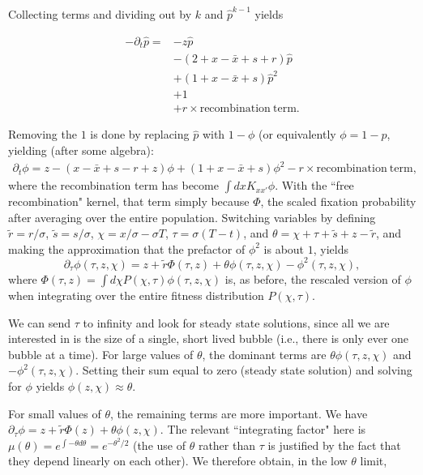 \documentclass[10pt]{revtex4}
\begin{document}
Collecting terms and dividing out by $k$ and $\hat{p}^{k-1}$ yields

\begin{align*}
-\partial_t\hat{p} = &-z\hat{p}\\
&-(2+x-\bar{x}+s+r)\hat{p} \\
&+ (1+x-\bar{x}+s)\hat{p}^2 \\
& + 1\\
&+r \times \mathrm{recombination~term}.
\end{align*}

Removing the $1$ is done by replacing $\hat{p}$ with $1-\phi$ (or equivalently $\phi = 1- \hat{p}$, yielding (after some algebra):
\begin{align*}\partial_t \phi = z - (x-\bar{x} + s - r+z)\phi + (1+x-\bar{x} + s)\phi^2 - r \times \mathrm{recombination~term},
\end{align*}
where the recombination term has become $\int dx K_{xx\prime} \phi$.
With the ``free recombination" kernel, that term simply because $\Phi$, the scaled fixation probability after averaging over the entire population.
Switching variables by defining $\tilde{r} = r/\sigma$, $\tilde{s} = s/\sigma$, $\chi = x/\sigma - \sigma T$, $\tau = \sigma(T-t)$, and $\theta = \chi+\tau+\tilde{s}+z-\tilde{r}$, and making the approximation that the prefactor of $\phi^2$ is about $1$, yields
\begin{equation}
\partial_\tau \phi(\tau,z,\chi) = z + \tilde{r} \Phi(\tau, z) + \theta \phi(\tau,z,\chi) - \phi^2(\tau,z,\chi),
\end{equation}
where $\Phi(\tau, z) = \int d\chi P(\chi, \tau) \phi(\tau, z, \chi)$ is, as before, the rescaled version of $\phi$ when integrating over the entire fitness distribution $P(\chi, \tau)$.

We can send $\tau$ to infinity and look for steady state solutions, since all we are interested in is the size of a single, short lived bubble (i.e., there is only ever one bubble at a time).
For large values of $\theta$, the dominant terms are $\theta \phi(\tau,z,\chi)$ and $-\phi^2(\tau,z,\chi)$.
Setting their sum equal to zero (steady state solution) and solving for $\phi$ yields $\phi(z,\chi) \approx \theta$.

For small values of $\theta$, the remaining terms are more important.
We have $\partial_\tau \phi = z + \tilde{r} \Phi(z) + \theta \phi(z, \chi)$.
The relevant ``integrating factor" here is $\mu(\theta) = e^{\int -\theta d\theta} = e^{-\theta^2/2}$ (the use of $\theta$ rather than $\tau$ is justified by the fact that they depend linearly on each other).
We therefore obtain, in the low $\theta$ limit,
\end{document}
